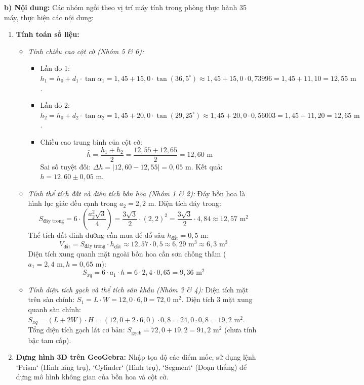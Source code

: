 \documentclass[12pt, a4paper]{article}
\begin{document}
\noindent \textbf{b) Nội dung:}
Các nhóm ngồi theo vị trí máy tính trong phòng thực hành 35 máy, thực hiện các nội dung:
\begin{enumerate}
    \item \textbf{Tính toán số liệu:}
    \begin{itemize}
        \item \textit{Tính chiều cao cột cờ (Nhóm 5 \& 6):}
        \begin{itemize}
            \item Lần đo 1: $h_1 = h_0 + d_1 \cdot \tan\alpha_1 = 1{,}45 + 15{,}0 \cdot \tan(36{,}5^\circ) \approx 1{,}45 + 15{,}0 \cdot 0{,}73996 = 1{,}45 + 11{,}10 = 12{,}55\text{ m}$.
            \item Lần đo 2: $h_2 = h_0 + d_2 \cdot \tan\alpha_2 = 1{,}45 + 20{,}0 \cdot \tan(29{,}25^\circ) \approx 1{,}45 + 20{,}0 \cdot 0{,}56003 = 1{,}45 + 11{,}20 = 12{,}65\text{ m}$.
            \item Chiều cao trung bình của cột cờ:
            $$\bar{h} = \dfrac{h_1 + h_2}{2} = \dfrac{12{,}55 + 12{,}65}{2} = 12{,}60\text{ m}$$
            Sai số tuyệt đối: $\Delta h = |12{,}60 - 12{,}55| = 0{,}05\text{ m}$. Kết quả: $h = 12{,}60 \pm 0{,}05\text{ m}$.
        \end{itemize}
        \item \textit{Tính thể tích đất và diện tích bồn hoa (Nhóm 1 \& 2):}
        Đáy bồn hoa là hình lục giác đều cạnh trong $a_2 = 2{,}2\text{ m}$. Diện tích đáy trong:
        $$S_{\text{đáy trong}} = 6 \cdot \left(\dfrac{a_2^2 \sqrt{3}}{4}\right) = \dfrac{3\sqrt{3}}{2} \cdot (2{,}2)^2 = \dfrac{3\sqrt{3}}{2} \cdot 4{,}84 \approx 12{,}57\text{ m}^2$$
        Thể tích đất dinh dưỡng cần mua để đổ sâu $h_{\text{đất}} = 0{,}5\text{ m}$:
        $$V_{\text{đất}} = S_{\text{đáy trong}} \cdot h_{\text{đất}} \approx 12{,}57 \cdot 0{,}5 \approx 6{,}29\text{ m}^3 \approx 6{,}3\text{ m}^3$$
        Diện tích xung quanh mặt ngoài bồn hoa cần sơn chống thấm ($a_1 = 2{,}4\text{ m}, h = 0{,}65\text{ m}$):
        $$S_{xq} = 6 \cdot a_1 \cdot h = 6 \cdot 2{,}4 \cdot 0{,}65 = 9{,}36\text{ m}^2$$
        \item \textit{Tính diện tích gạch và thể tích sân khấu (Nhóm 3 \& 4):}
        Diện tích mặt trên sàn chính: $S_1 = L \cdot W = 12{,}0 \cdot 6{,}0 = 72{,}0\text{ m}^2$.
        Diện tích 3 mặt xung quanh sàn chính: $S_{xq} = (L + 2W) \cdot H = (12{,}0 + 2 \cdot 6{,}0) \cdot 0{,}8 = 24{,}0 \cdot 0{,}8 = 19{,}2\text{ m}^2$.
        Tổng diện tích gạch lát cơ bản: $S_{\text{gạch}} = 72{,}0 + 19{,}2 = 91{,}2\text{ m}^2$ (chưa tính bậc tam cấp).
    \end{itemize}

    \item \textbf{Dựng hình 3D trên GeoGebra:}
    Nhập tọa độ các điểm mốc, sử dụng lệnh `Prism` (Hình lăng trụ), `Cylinder` (Hình trụ), `Segment` (Đoạn thẳng) để dựng mô hình không gian của bồn hoa và cột cờ.
\end{enumerate}
\end{document}
